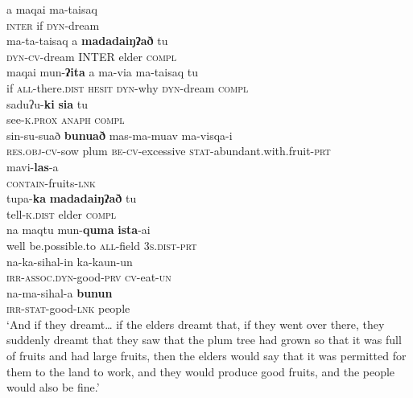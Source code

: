 \documentclass[output=paper
,modfonts
,nonflat]{langsci/langscibook}
\begin{document}
\largerpage[2]
\begin{exe}
	\label{tx2-4}
	\begin{xlist}
		\ex\label{tx2-4a}
		\gll a  maqai  ma-taisaq\\
		\textsc{inter}  if  \textsc{dyn}-dream\\
		\ex\label{tx2-4b}
		\gll ma-ta-taisaq  a  \textbf{madadaiŋʔað}  tu\\
		\textsc{dyn}-\textsc{cv}-dream  INTER  elder  \textsc{compl}\\
		\ex\label{tx2-4c}
		\gll maqai  mun-\textbf{ʔita}  a  ma-via  ma-taisaq  tu\\
		if  \textsc{all}-there.\textsc{dist}  \textsc{hesit}  \textsc{dyn}-why  \textsc{dyn}-dream  \textsc{compl}\\
		\ex\label{tx2-4d}
		\gll saduʔu-\textbf{ki}  \textbf{sia}  tu\\
		see-\textsc{k}.\textsc{prox}  \textsc{anaph}  \textsc{compl}\\
		\ex\label{tx2-4e}
		\gll sin-su-suað  \textbf{bunuað}  mas-ma-muav  ma-visqa-i\\
		\textsc{res.obj}-\textsc{cv}-sow  plum  \textsc{be}-\textsc{cv}-excessive  \textsc{stat}-abundant.with.fruit-\textsc{prt}\\
		\ex\label{tx2-4f}
		\gll mavi-\textbf{las}-a\\
		\textsc{contain}-fruits-\textsc{lnk}\\
		\ex\label{tx2-4g}
		\gll tupa-\textbf{ka}  \textbf{madadaiŋʔað}  tu\\
		tell-\textsc{k}.\textsc{dist}  elder  \textsc{compl}\\
		\ex\label{tx2-4h}
		\gll na  maqtu  mun-\textbf{quma}  \textbf{ista}-ai\\
		well  be.possible.to  \textsc{all}-field  \textsc{3s}.\textsc{dist}-\textsc{prt}\\
		\ex\label{tx2-4i}
		\gll na-ka-sihal-in  ka-kaun-un\\
		\textsc{irr}-\textsc{assoc}.\textsc{dyn}-good-\textsc{prv}  \textsc{cv}-eat-\textsc{un}\\
		\ex\label{tx2-4j}
		\gll na-ma-sihal-a  \textbf{bunun}\\
		\textsc{irr}-\textsc{stat}-good-\textsc{lnk}  people\\
		\glt `And if they dreamt… if the elders dreamt that, if they went over there, they suddenly dreamt that they saw that the plum tree had grown so that it was full of fruits and had large fruits, then the elders would say that it was permitted for them to the land to work, and they would produce good fruits, and the people would also be fine.’
	\end{xlist}
\end{exe}
\end{document}
